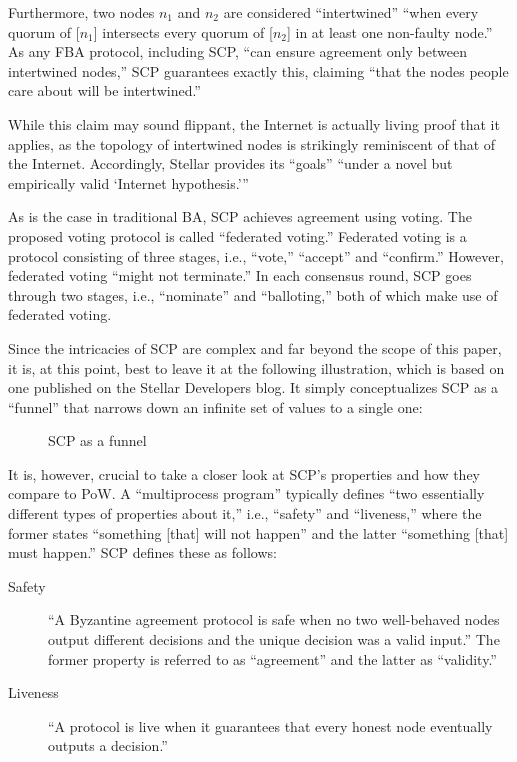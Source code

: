 Furthermore, two nodes $n_1$ and $n_2$ are considered ``intertwined'' ``when every quorum of [$n_1$] intersects every quorum of [$n_2$] in at least one non-faulty node.'' \autocite[4]{lokhava2019}
As any FBA protocol, including SCP, ``can ensure agreement only between intertwined nodes,'' SCP guarantees exactly this, claiming ``that the nodes people care about will be intertwined.'' \autocite[4]{lokhava2019}

While this claim may sound flippant, the Internet is actually living proof that it applies, as the topology of intertwined nodes is strikingly reminiscent of that of the Internet.
Accordingly, Stellar provides its ``goals'' \enquote{under a novel but empirically valid \enquote{Internet hypothesis.}} \autocite[1]{lokhava2019}

As is the case in traditional BA, SCP achieves agreement using voting.
The proposed voting protocol is called ``federated voting.''
Federated voting is a protocol consisting of three stages, i.e., ``vote,'' ``accept'' and ``confirm.'' \autocite[6]{lokhava2019}
However, federated voting ``might not terminate.'' \autocite[6]{lokhava2019}
In each consensus round, SCP goes through two stages, i.e., ``nominate'' and ``balloting,'' both of which make use of federated voting. \autocite[5, 6]{lokhava2019}

Since the intricacies of SCP are complex and far beyond the scope of this paper, it is, at this point, best to leave it at the following illustration, which is based on one published on the Stellar Developers blog. \autocite{stellar2019intuitivescp}
It simply conceptualizes SCP as a ``funnel'' that narrows down an infinite set of values to a single one:
\\
\begin{figure}[H]
\centering

\caption*{SCP as a funnel \autocite{stellar2019intuitivescp}}
\end{figure}

It is, however, crucial to take a closer look at SCP's properties and how they compare to PoW.
A ``multiprocess program'' typically defines ``two essentially different types of properties about it,'' i.e., ``safety'' and ``liveness,'' where the former states ``something [that] will not happen'' and the latter ``something [that] must happen.'' \autocite[125]{lamport1977}
SCP defines these as follows:
 
\begin{description}
\item[Safety]
``A Byzantine agreement protocol is safe when no two well-behaved nodes output different decisions and the unique decision was a valid input.'' \autocite[3]{lokhava2019}
The former property is referred to as ``agreement'' and the latter as ``validity.'' \autocite{mazieres2019}
\item[Liveness]
``A protocol is live when it guarantees that every honest node eventually outputs a decision.''
\autocite[4]{lokhava2019}
\end{description}

